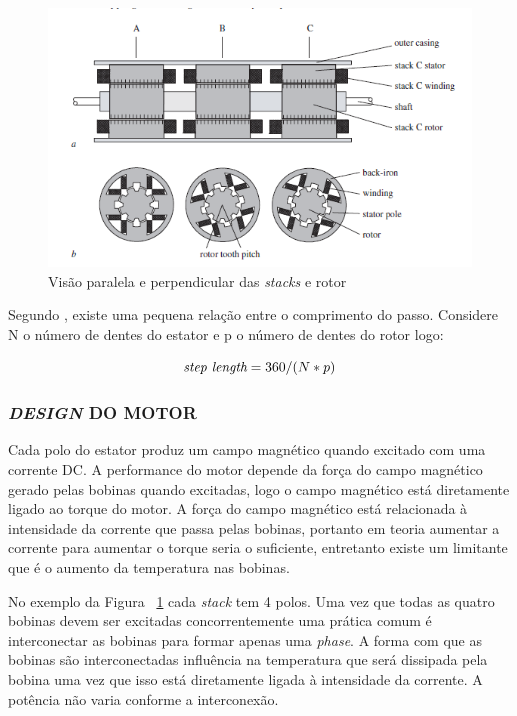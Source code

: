 \begin{figure}[htp]
	\centering
	\includegraphics[scale=1]{images/visao_motor_passo.png}
	\caption{Visão paralela e perpendicular das \emph{stacks} e rotor}	
	\label{fig:visaomotorpasso}	
\end{figure}

\newpage Segundo \cite{acarnley2002stepping}, existe uma pequena relação entre o comprimento do passo. Considere N o número de dentes do estator e p o número de dentes do rotor logo: 

\begin{equation}
  \emph{step length} = 360/(N * p)
\end{equation}

\subsubsection{\emph{DESIGN} DO MOTOR}
Cada polo do estator produz um campo magnético quando excitado com uma corrente DC. A performance do motor depende da força do campo magnético gerado pelas bobinas quando excitadas, logo o campo magnético está diretamente ligado ao torque do motor. A força do campo magnético está relacionada à intensidade da corrente que passa pelas bobinas, portanto em teoria aumentar a corrente para aumentar o torque seria o suficiente, entretanto existe um limitante que é o aumento da temperatura nas bobinas.

No exemplo da Figura ~\ref{fig:visaomotorpasso} cada \emph{stack} tem 4 polos. Uma vez que todas as quatro bobinas devem ser excitadas concorrentemente uma prática comum é interconectar as bobinas para formar apenas uma \emph{phase}. A forma com que as bobinas são interconectadas influência na temperatura que será dissipada pela bobina uma vez que isso está diretamente ligada à intensidade da corrente. A potência não varia conforme a interconexão. 

